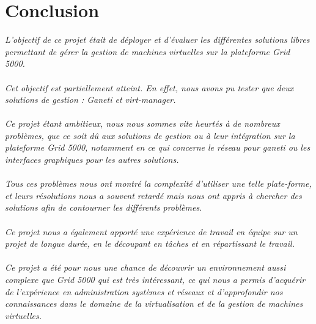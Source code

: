 \chapter{Conclusion}
\emph{L'objectif de ce projet était de déployer et d'évaluer les différentes solutions libres permettant de gérer la gestion de machines virtuelles sur la plateforme Grid 5000.\\
\\
Cet objectif est partiellement atteint. En effet, nous avons pu tester que deux solutions de gestion : Ganeti et virt-manager.\\
\\
Ce projet étant ambitieux, nous nous sommes vite heurtés à de nombreux problèmes, que ce soit dû aux solutions de gestion ou à leur intégration sur la plateforme Grid 5000, notamment en ce qui concerne le réseau pour ganeti ou les interfaces graphiques pour les autres solutions.\\
\\
Tous ces problèmes nous ont montré la complexité d'utiliser une telle plate-forme, et leurs résolutions nous a souvent retardé mais nous ont appris à chercher des solutions afin de contourner les différents problèmes.\\
\\
Ce projet nous a également apporté une expérience de travail en équipe sur un projet de longue durée, en le découpant en tâches et en répartissant le travail.\\
\\
Ce projet a été pour nous une chance de découvrir un environnement aussi complexe que Grid 5000 qui est très intéressant, ce qui nous a permis d'acquérir de l'expérience en administration systèmes et réseaux et d'approfondir nos connaissances dans le domaine de la virtualisation et de la gestion de machines virtuelles.}
